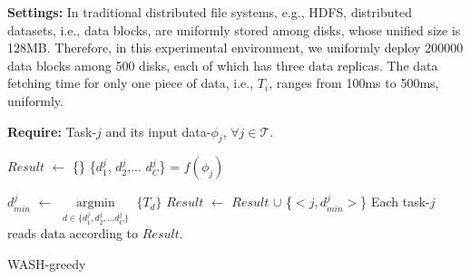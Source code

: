 \documentclass[conference]{IEEEtran}
\begin{document}

\textbf{Settings:}
In traditional distributed file systems, e.g., HDFS\cite{b19}, distributed datasets, i.e., data blocks, are uniformly stored among disks, whose unified size is 128MB. Therefore, in this experimental environment, we uniformly deploy 200000 data blocks among 500 disks, each of which has three data replicas. The data fetching time for only one piece of data, i.e., $T_i$, ranges from 100ms to 500ms, uniformly. 

\begin{algorithm}[!t]

    \textbf{Require:} Task-$j$ and its input data-$\phi_j$, $\forall j\in\mathcal{T}$.

    \begin{algorithmic}[1]
        
        \State $Result$ $\gets$ \{\}\label{WASH-greedy:init}
            \State \{$d_{1}^j$, $d_{2}^j$,... $d_{C}^j$\} = $f(\phi_j)$
        
    
            \State $d_{min}^j$ $\gets$ $\mathop{\arg\min}\limits_{d \in \{d_{1}^j, d_{2}^j,... d_{C}^j\}}$ $\{T_d\}$
            \State $Result$ $\gets$ $Result$ $\cup$
            \{$< j, d_{min}^j>$\}
        \EndFor
    \State  Each task-$j$ reads data according to $Result$.
    \end{algorithmic}
    \caption{WASH-greedy}\label{WASH-greedy}
\end{algorithm}
\end{document}
